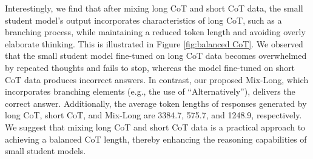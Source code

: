 Interestingly, we find that after mixing long CoT and short CoT data, the small student model’s output incorporates characteristics of long CoT, such as a branching process, while maintaining a reduced token length and avoiding overly elaborate thinking. This is illustrated in Figure \ref{fig:balanced CoT}. We observed that the small student model fine-tuned on long CoT data becomes overwhelmed by repeated thoughts and fails to stop, whereas the model fine-tuned on short CoT data produces incorrect answers. In contrast, our proposed Mix-Long, which incorporates branching elements (e.g., the use of “Alternatively”), delivers the correct answer. Additionally, the average token lengths of responses generated by long CoT, short CoT, and Mix-Long are 3384.7, 575.7, and 1248.9, respectively. We suggest that mixing long CoT and short CoT data is a practical approach to achieving a balanced CoT length, thereby enhancing the reasoning capabilities of small student models.
